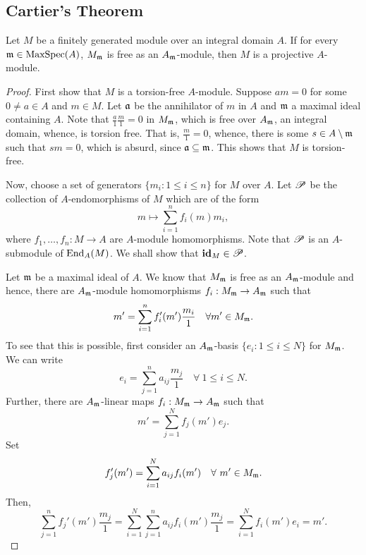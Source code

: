 \subsection{Cartier's Theorem}

\begin{theorem}[Cartier]
    Let $M$ be a finitely generated module over an integral domain $A$. If for every $\mathfrak{m}\in\operatorname{MaxSpec}(A)$, $M_{\mathfrak{m}}$ is free as an $A_{\mathfrak{m}}$-module, then $M$ is a projective $A$-module.
\end{theorem}
\begin{proof}
    First show that $M$ is a torsion-free $A$-module. Suppose $am = 0$ for some $0\ne a\in A$ and $m\in M$. Let $\mathfrak{a}$ be the annihilator of $m$ in $A$ and $\mathfrak{m}$ a maximal ideal containing $A$. Note that $\frac{a}{1}\frac{m}{1} = 0$ in $M_{\mathfrak{m}}$, which is free over $A_{\mathfrak{m}}$, an integral domain, whence, is torsion free. That is, $\frac{m}{1} = 0$, whence, there is some $s\in A\setminus\mathfrak{m}$ such that $sm = 0$, which is absurd, since $\mathfrak{a}\subseteq\mathfrak{m}$. This shows that $M$ is torsion-free.

    Now, choose a set of generators $\{m_i\colon 1\le i\le n\}$ for $M$ over $A$. Let $\mathscr P$ be the collection of $A$-endomorphisms of $M$ which are of the form 
    \begin{equation*}
        m\longmapsto\sum_{i = 1}^n f_i(m)m_i,
    \end{equation*}
    where $f_1,\dots, f_n: M\to A$ are $A$-module homomorphisms. Note that $\mathscr P$ is an $A$-submodule of $\operatorname{End}_A(M)$. We shall show that $\mathbf{id}_M\in\mathscr P$.

    Let $\mathfrak{m}$ be a maximal ideal of $A$. We know that $M_{\mathfrak{m}}$ is free as an $A_{\mathfrak{m}}$-module and hence, there are $A_{\mathfrak{m}}$-module homomorphisms $f_i: M_{\mathfrak{m}}\to A_{\mathfrak{m}}$ such that 
    \begin{equation*}
        m' = \sum_{i = 1}^n f_i'(m')\frac{m_i}{1}\quad\forall m'\in M_{\mathfrak{m}}.
    \end{equation*}
    To see that this is possible, first consider an $A_{\mathfrak{m}}$-basis $\{e_i\colon 1\le i\le N\}$ for $M_{\mathfrak{m}}$. We can write 
    \begin{equation*}
        e_i = \sum_{j = 1}^n a_{ij}\frac{m_j}{1}\quad\forall~1\le i\le N.
    \end{equation*}
    Further, there are $A_{\mathfrak{m}}$-linear maps $f_i: M_{\mathfrak{m}}\to A_{\mathfrak{m}}$ such that 
    \begin{equation*}
        m' = \sum_{j = 1}^N f_j(m')e_j.
    \end{equation*}
    Set 
    \begin{equation*}
        f_j'(m') = \sum_{i = 1}^N a_{ij}f_i(m')\quad\forall~m'\in M_{\mathfrak{m}}.
    \end{equation*}
    Then, 
    \begin{equation*}
        \sum_{j = 1}^nf_j'(m')\frac{m_j}{1} = \sum_{i = 1}^N\sum_{j = 1}^n a_{ij}f_i(m')\frac{m_j}{1} = \sum_{i = 1}^N f_i(m')e_i = m'.
    \end{equation*}


\end{proof}
